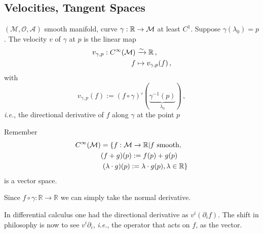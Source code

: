 \documentclass[11pt, a4paper, twocolumn]{article} %
\begin{document}
\subsection{Velocities, Tangent Spaces}
\begin{defn}[Velocity]
    $(\mathcal{M,O,A})$ smooth manifold, curve $\gamma: \mathbb{R}\to \mathcal{M}$ at least $C^1$.
    Suppose $\gamma(\lambda_0) = p$.
    The velocity $v$ of $\gamma$ at $p$ is the linear map
    \begin{align*}
        v_{\gamma, p}: C^\infty(\mathcal{M}) &\xrightarrow[]{\sim} \mathbb{R}\,,\\
        f &\mapsto v_{\gamma, p}(f)\,,
    \end{align*}
    with
    \begin{equation}
        \boxed{
        v_{\gamma,p}(f) := (f \circ \gamma)'(\underbrace{\gamma^{-1}(p)}_{\lambda_0})
    }\,,
    \end{equation}
    \textit{i.e.}, the directional derivative of $f$ along $\gamma$ at the point $p$
\end{defn}
\begin{note}
    Remember 
    \begin{align}
        C^\infty(\mathcal{M}) &= \left\{ f: \mathcal{M}\to\mathbb{R} | f \text{ smooth, }\right. \nonumber\\
            &(f+g)(p):= f(p) + g(p)\\
            &\left.(\lambda \cdot g)(p) := \lambda \cdot g(p), \lambda \in \mathbb{R}\right\}\nonumber
    \end{align}
    is a vector space.
\end{note}
Since $f\circ\gamma: \mathbb{R}\to\mathbb{R}$ we can simply take the normal derivative.
\begin{center}
\end{center}
\begin{note}
    In differential calculus one had the directional derivative as $v^i(\partial_i f)$.
    The shift in philosophy is now to see $v^i\partial_i$, \textit{i.e.}, the operator
    that acts on $f$, as the vector.
\end{note}
\end{document}
